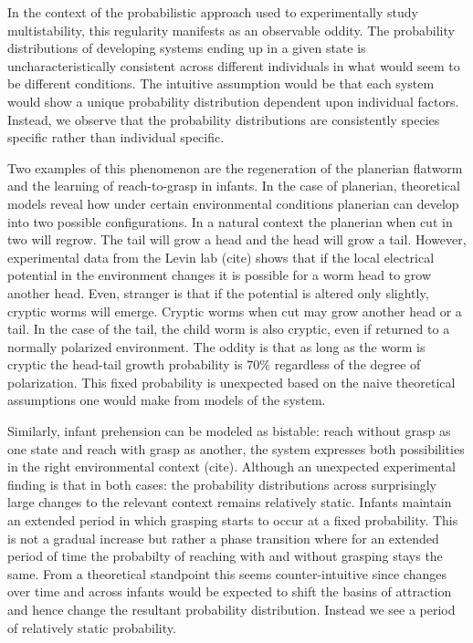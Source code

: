\documentclass[letterpaper]{article}
\begin{document}
In the context of the probabilistic approach used to experimentally 
study multistability, this regularity manifests as an observable oddity.
The probability distributions of developing systems ending up in a given
state is uncharacteristically consistent across different individuals 
in what would seem to be different conditions. The intuitive assumption
would be that each system would show a unique probability distribution
dependent upon individual factors. Instead, we observe that the probability
distributions are consistently species specific rather than individual specific.

Two examples of this phenomenon are the regeneration of the planerian flatworm
and the learning of reach-to-grasp in infants. In the case of planerian,
theoretical models reveal how under certain environmental conditions 
planerian can develop into two possible configurations. In a natural context
the planerian when cut in two will regrow. The tail will grow a head and the
head will grow a tail. However, experimental data from the Levin lab (cite) 
shows that
if the local electrical potential in the environment changes it is possible for 
a worm head to grow another head. Even, stranger is that if the potential
is altered only slightly, cryptic worms will emerge. Cryptic worms when cut 
may grow another head or a tail. In the case of the tail, the child worm is 
also cryptic, even if returned to a normally polarized environment. The oddity
is that as long as the worm is cryptic the head-tail growth probability is $70\%$
regardless of the degree of polarization. This fixed probability is unexpected 
based on the naive theoretical assumptions one would make from models of the
system.

Similarly, infant
prehension can be modeled as bistable: reach without grasp as one state
and reach with grasp as another, the system expresses both possibilities in the right
environmental context (cite). 
Although an unexpected experimental finding is that in
both cases: the probability distributions across surprisingly large changes
to the relevant context remains relatively static. Infants maintain an extended 
period in which grasping starts to occur at a fixed probability. This is not a gradual
increase but rather a phase transition where for an extended period of time 
the probabilty
of reaching with and without grasping stays the same.
From a theoretical standpoint this seems 
counter-intuitive since changes over time and across infants would be expected 
to shift the basins of attraction and hence change the resultant probability 
distribution. Instead we see a period of relatively static probability.
\end{document}
